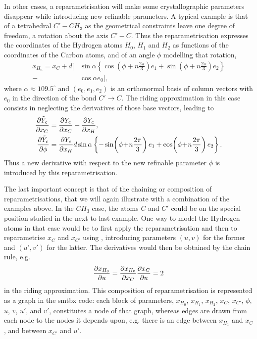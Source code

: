 \documentclass{iucr}
\begin{document}
In other cases, a reparametrisation will make some crystallographic parameters disappear while introducing new refinable parameters. A typical example is that of a tetrahedral $C' - CH_3$ as the geometrical constraints leave one degree of freedom, a rotation about the axis $C' - C$. Thus the reparametrisation expresses the coordinates of the Hydrogen atoms $H_0$, $H_1$ and $H_2$ as functions of the coordinates of the Carbon atoms, and of an angle $\phi$ modelling that rotation,
\newcommand{\hydrogenphiarg}{\!\left(\phi\!+\!n \frac{2\pi}{3}\right)}
\begin{equation}
\begin{split}
x_{H_n} = x_C 
+ d \Biggl[ &\sin \alpha \left\{ \cos\hydrogenphiarg e_1 + \sin\hydrogenphiarg e_2 \right\}\\
- &\cos\alpha e_0
\Biggr],
\end{split}
\label{eqn:rotatingch3reparam}
\end{equation}
where $\alpha \approx 109.5^\circ$ and $(e_0, e_1, e_2)$ is an orthonormal basis of column vectors with $e_0$ in the direction of the bond $C' \rightarrow C$. The riding approximation in this case consists in neglecting the derivatives of those base vectors, leading to
\begin{align}
\partialder{\tilde{Y}_c}{x_C} &= \partialder{Y_c}{x_C} + \partialder{Y_c}{x_H},\\
\partialder{\tilde{Y}_c}{\phi} &= \partialder{Y_c}{x_H} 
d \sin \alpha \left\{ -\sin\hydrogenphiarg e_1 + \cos\hydrogenphiarg e_2 \right\}.
\end{align}
Thus a new derivative with respect to the new refinable parameter $\phi$ is introduced by this reparametrisation.

The last important concept is that of the chaining or composition of reparametrisations, that we will again illustrate with a combination of the examples above. In the $CH_3$ case, the atoms $C$ and $C'$ could be on the special position studied in the next-to-last example. One way to model the Hydrogen atoms in that case would be to first apply the reparametrisation  and then to reparametrise $x_C$ and $x_{C'}$ using , introducing parameters $(u,v)$ for the former and $(u',v')$ for the latter. The derivatives would then be obtained by the chain rule, e.g.
\begin{equation}
\frac{\partial x_{H_0}}{\partial u} = \frac{\partial x_{H_0}}{\partial x_C}\frac{\partial x_C}{\partial u} = 2
\end{equation}
in the riding approximation. This composition of reparametrisation is represented as a graph in the smtbx code: each block of parameters, $x_{H_0}$, $x_{H_1}$, $x_{H_2}$, $x_C$, $x_{C'}$, $\phi$, $u$, $v$, $u'$, and $v'$, constitutes a node of that graph, whereas edges are drawn from each node to the nodes it depends upon, e.g. there is an edge between $x_{H_1}$ and $x_C$, and between $x_{C'}$ and $u'$. 
\end{document}
